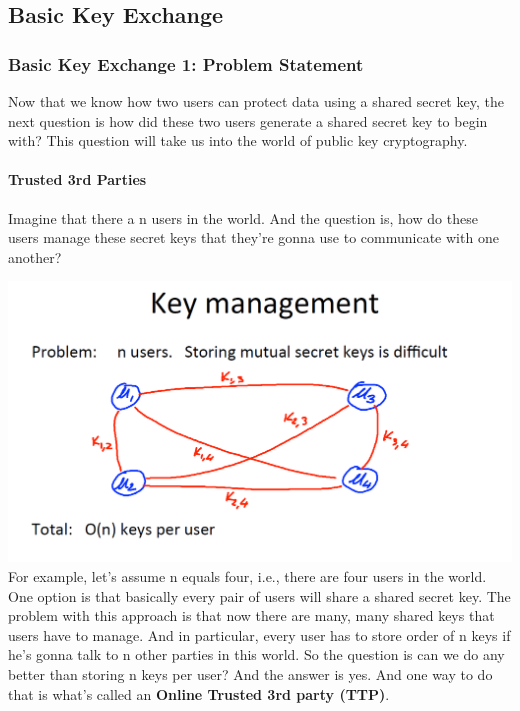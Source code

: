 \documentclass[11pt]{article}
\makeatletter
\def\maxwidth{\ifdim\Gin@nat@width>\linewidth\linewidth
    \else\Gin@nat@width\fi}
\let\Oldincludegraphics\includegraphics
\renewcommand{\includegraphics}[1]{\Oldincludegraphics[width=.8\maxwidth]{#1}}
\makeatother
\begin{document}
    \hypertarget{basic-key-exchange}{%
\subsection{Basic Key Exchange}\label{basic-key-exchange}}

\hypertarget{basic-key-exchange-1-problem-statement}{%
\subsubsection{Basic Key Exchange 1: Problem
Statement}\label{basic-key-exchange-1-problem-statement}}

Now that we know how two users can protect data using a shared secret
key, the next question is how did these two users generate a shared
secret key to begin with? This question will take us into the world of
public key cryptography.

\hypertarget{trusted-3rd-parties}{%
\paragraph{Trusted 3rd Parties}\label{trusted-3rd-parties}}

Imagine that there a n users in the world. And the question is, how do
these users manage these secret keys that they're gonna use to
communicate with one another?

\includegraphics{./Images/KeyManage-Prob.png} For example, let's assume
n equals four, i.e., there are four users in the world. One option is
that basically every pair of users will share a shared secret key. The
problem with this approach is that now there are many, many shared keys
that users have to manage. And in particular, every user has to store
order of n keys if he's gonna talk to n other parties in this world. So
the question is can we do any better than storing n keys per user? And
the answer is yes. And one way to do that is what's called an
\textbf{Online Trusted 3rd party (TTP)}.
\end{document}
